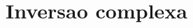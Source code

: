 \documentclass[12pt,twoside, a4paper, twocolumn]{article}
\newcommand{\drawvector} [9] [color=cyan] {
    \draw[line width=1.5pt,#1,-stealth](axis cs: #2, #3)--(axis cs: #4, #5) node[anchor=south west]{$#6$};

    

\ifthenelse{\equal{#7}{true}}{
    \draw[line width=1pt,#1, dashed](axis cs: #4, #5)--(axis cs: #4, 0) node[anchor= north west]{$#8$};
    \draw[line width=1pt,#1, dashed](axis cs: #4, #5)--(axis cs: 0, #5) node[anchor=south east]{$#9$};
    }
    {}
}
\begin{document}

%  







\section{Inversao complexa}
\end{document}
